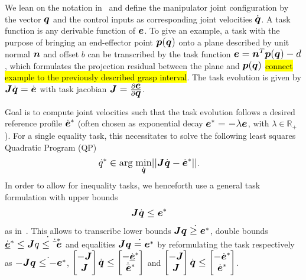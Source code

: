 We lean on the notation in~\cite{Esca14} and define the manipulator joint configuration by the
vector $\mbm{q}$ and the control inputs as corresponding joint velocities $\dot{\mbm{q}}$. A task
function is any derivable function of $\mbm{e}$. To give an example, a task with the purpose of
bringing an end-effector point $\mbm{p}(\mbm{q})$ onto a plane described by unit normal $\mbm{n}$
and offset $b$ can be transcribed by the task function $\mbm{e}=\mbm{n}^T\mbm{p}(\mbm{q})-d$, which
formulates the projection residual between the plane and $\mbm{p}(\mbm{q})$ \hl{connect example to
  the previously described grasp interval}. The task evolution is given by
$\mbm{J}\dot{\mbm{q}}=\dot{\mbm{e}}$ with task jacobian
$\mbm{J}=\frac{\partial\mbm{e}}{\partial\mbm{q}}$.

Goal is to compute joint velocities such that the task evolution follows a desired reference profile
$\dot{\mbm{e}}^*$ (often chosen as exponential decay $\mbm{e}^*= -\lambda \mbm{e}$, with $\lambda
\in \mathbb{R}_+$). For a single equality task, this necessitates to solve the following least
squares Quadratic Program (QP)
%
\begin{align}\label{eq:QP}
  \dot{q}^* &\in \mbox{arg} \; \underset{\footnotesize\dot{\mbm{q}}\normalsize}{\mbox{min}}||\mbm{J}\dot{\mbm{q}}-\dot{\mbm{e}}^*||.
\end{align}
%
In order to allow for inequality tasks, we henceforth use a general task formulation with upper
bounds 
\begin{align}\label{eq:task}
 \mbm{J}\dot{\mbm{q}}&\leq \mbm{e}^*
\end{align}
%
as in~\cite{Esca14}. This allows to transcribe lower bounds $\mbm{J}\dot{\mbm{q} \geq \mbm{e}^*}$,
double bounds $\dot{\underline{\mbm{e}}}^* \leq \mbm{J}\dot{\mbm{q} \leq \dot{\bar{\mbm{e}}}^*}$ and
equalities $\mbm{J}\dot{\mbm{q}=\mbm{e}^*}$ by reformulating the task respectively as
$-\mbm{J}\dot{\mbm{q} \leq -\mbm{e}^*}$, $\begin{bmatrix} -\mbm{J} \\
  \mbm{J} \end{bmatrix}\dot{\mbm{q}} \leq \begin{bmatrix} -\dot{\underline{\mbm{e}}}^*
  \\ \dot{\bar{\mbm{e}}}^* \end{bmatrix}$ and $\begin{bmatrix} -\mbm{J} \\
  \mbm{J} \end{bmatrix}\dot{\mbm{q}} \leq \begin{bmatrix} -\dot{\mbm{e}}^* \\
  \dot{\mbm{e}}^* \end{bmatrix}$.

